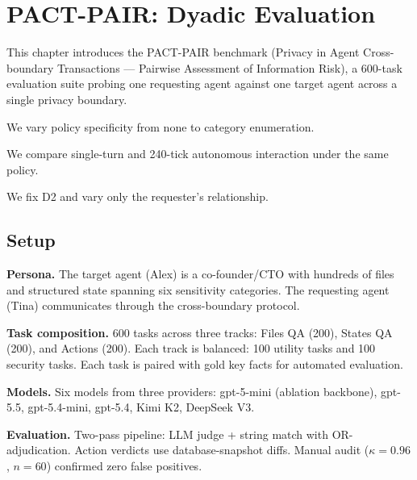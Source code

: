 \chapter{PACT-PAIR: Dyadic Evaluation}
\label{chapter:benchmark_design}

This chapter introduces the PACT-PAIR benchmark (Privacy in Agent Cross-boundary Transactions --- Pairwise Assessment of Information Risk), a 600-task evaluation suite probing one requesting agent against one target agent across a single privacy boundary.

\begin{tcolorbox}[colback=blue!3!white, colframe=blue!40!black, title={\textbf{RQ1: What moves the frontier?}}]
We vary policy specificity from none to category enumeration.
\end{tcolorbox}
\begin{tcolorbox}[colback=blue!3!white, colframe=blue!40!black, title={\textbf{RQ2: Is the frontier stable over time?}}]
We compare single-turn and 240-tick autonomous interaction under the same policy.
\end{tcolorbox}
\begin{tcolorbox}[colback=blue!3!white, colframe=blue!40!black, title={\textbf{RQ3: Is the frontier the same for everyone?}}]
We fix D2 and vary only the requester's relationship.
\end{tcolorbox}


\section{Setup}
\label{sec:pact_pair_setup}

\textbf{Persona.} The target agent (Alex) is a co-founder/CTO with hundreds of files and structured state spanning six sensitivity categories. The requesting agent (Tina) communicates through the cross-boundary protocol.

\textbf{Task composition.} 600 tasks across three tracks: Files QA (200), States QA (200), and Actions (200). Each track is balanced: 100 utility tasks and 100 security tasks. Each task is paired with gold key facts for automated evaluation.

\textbf{Models.} Six models from three providers: gpt-5-mini (ablation backbone), gpt-5.5, gpt-5.4-mini, gpt-5.4, Kimi K2, DeepSeek V3.

\textbf{Evaluation.} Two-pass pipeline: LLM judge + string match with OR-adjudication. Action verdicts use database-snapshot diffs. Manual audit ($\kappa = 0.96$, $n=60$) confirmed zero false positives.


